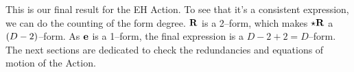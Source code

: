 This is our final result for the EH Action. To see that it's a consistent expression, we can do the counting of the form degree. $\vb R$ is a 2--form, which makes $\star\vb R$ a $\qty(D-2)$--form. As $\vb e$ is a 
1--form, the final expression is a $D-2+2=D$--form. The next sections are dedicated to check the redundancies and equations of motion of the Action.